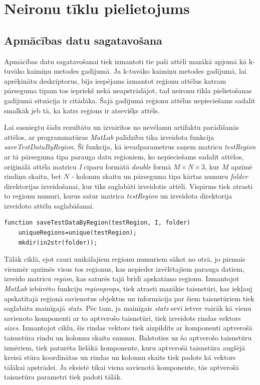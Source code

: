 \documentclass[12pt,paper=a4]{report}
\begin{document}
\section{Neironu tīklu pielietojums}
\subsection{Apmācības datu sagatavošana} \label{ssec:apmDati}
Apmācības datu sagatavošanai tiek izmantoti tie paši attēli mazākā apjomā kā k-tuvāko kaimiņu metodes gadījumā. Ja k-tuvāko kaimiņu metodes gadījumā, lai aprēķinātu deskriptorus, bija iespējams izmantot reģionu attēlus katram pārseguma tipam tos iepriekš nekā neapstrādājot, tad neironu tīkla pielietošanas gadījumā situācija ir citādāka. Šajā gadījumā reģionu attēlus nepieciešams sadalīt smalkāk jeb tā, ka katrs reģions ir atsevišķs attēls. \par
Lai sasniegtu šādu rezultātu un izvairītos no nevēlamu artifaktu parādīšanās attēlos, ar programmatūras \textit{MatLab} palīdzību tika izveidota funkcija \textit{saveTestDataByRegion}. Šī funkcija, kā ievadparametrus saņem matricu \textit{testRegion} ar tā pārseguma tipa parauga datu reģioniem, ko nepieciešams sadalīt attēlos, oriģinālā attēla matricu \textit{I} ciparu formātā \textit{double} formā $ M \times N \times 3 $, kur $ M $ apzīmē rindiņu skaitu, bet $ N $ - kolonnu skaitu un pārseguma tipa kārtas numuru \textit{folder} direktorijas izveidošanai, kur tiks saglabāti izveidotie attēli. Vispirms tiek atrasti to reģionu numuri, kurus satur matrica \textit{testRegion} un izveidota direktorija izveidoto attēlu saglabāšanai.
\begin{lstlisting}
function saveTestDataByRegion(testRegion, I, folder)
	uniqueRegions=unique(testRegion);
	mkdir(in2str(folder));
\end{lstlisting}\par
Tālāk ciklā, ejot cauri unikālajiem reģionu numuriem sākot no otrā, jo pirmais vienmēr apzīmēs visus tos reģionus, kas nepieder izvēlētajiem parauga datiem, izveido matricu \textit{region}, kas saturēs tajā brīdī apskatāmo reģionu. Izmantojot \textit{MatLab} iebūvēto funkciju \textit{regionprops}, tiek atrasti mazākie taisnstūri, kas iekļauj apskatītajā reģionā savienotus objektus un informācija par šiem taisnstūriem tiek saglabāta mainīgajā \textit{stats}. Pēc tam, ja mainīgais \textit{stats} sevī ietver vairāk kā vienu savienoto komponenti ar to aptverošo taisnstūri, tiek izveidots rindas vektors \textit{sizes}. Izmantojot ciklu, šis rindas vektors tiek aizpildīts ar komponenti aptverošā taisnstūra rindu un kolonnu skaita summu. Balstoties uz šo aptverošo taisnstūru izmēriem, tiek paturēta lielākā komponente, kuru aptverošā taisnstūra augšējā kreisā stūra koordinātas un rindas un kolonnu skaits tiek padots kā vektors tālākai apstrādei. Ja eksistē tikai viena savienotā komponente,  tās aptverošā taisnstūra parametri tiek padoti tālāk.
\end{document}
